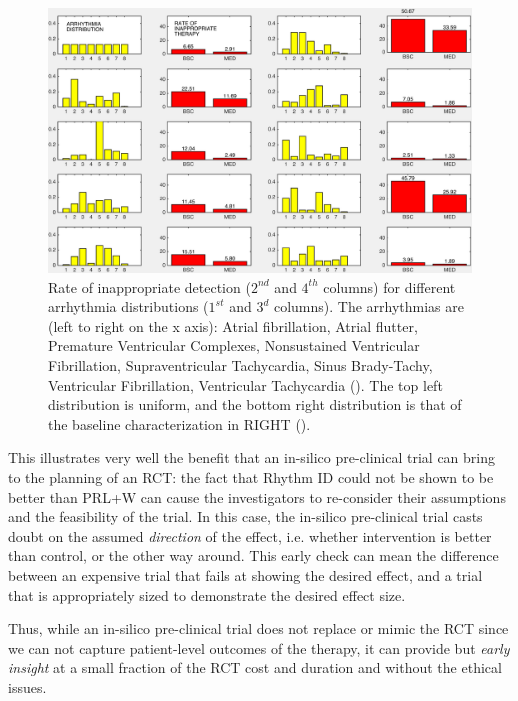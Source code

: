 \begin{figure}[t]
\centering
\includegraphics[scale=0.4]{figures/popvar9}
\caption{\small Rate of inappropriate detection ($2^{nd}$ and $4^{th}$ columns) for different arrhythmia distributions ($1^{st}$ and $3^d$ columns). The arrhythmias are (left to right on the x axis): Atrial fibrillation, Atrial flutter, Premature Ventricular Complexes, Nonsustained Ventricular Fibrillation, Supraventricular Tachycardia, Sinus Brady-Tachy, Ventricular Fibrillation, Ventricular Tachycardia (\cite{josephson}). The top left distribution is uniform, and the bottom right distribution is that of the baseline characterization in RIGHT (\cite{GoldABBTB11_RIGHTresults}).}
\label{fig:popvar8}
\end{figure}

This illustrates very well the benefit that an in-silico pre-clinical trial can bring to the planning of an RCT: the fact that Rhythm ID could not be shown to be better than PRL+W %
can cause the investigators to re-consider their assumptions and the feasibility of the trial.
In this case, the in-silico pre-clinical trial casts doubt on the assumed \emph{direction} of the effect, i.e. whether intervention is better than control, or the other way around.
This early check can mean the difference between an expensive trial that fails at showing the desired effect, and a trial that is appropriately sized to demonstrate the desired effect size.

Thus, while an in-silico pre-clinical trial does not replace or mimic the RCT since we can not capture patient-level outcomes of the therapy, it can provide  but \emph{early insight} at a small fraction of the RCT cost and duration and without the ethical issues.	 

